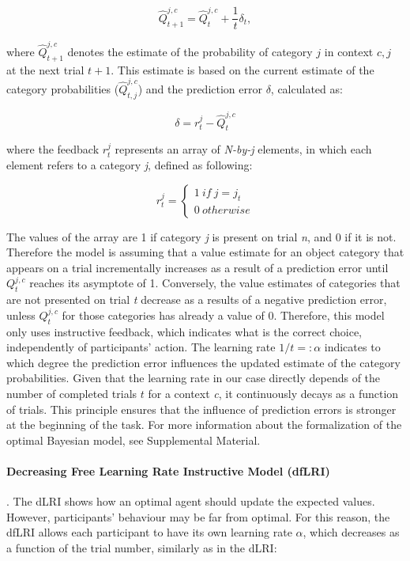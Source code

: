 \documentclass[a4paper,12pt]{article}
\begin{document}
\begin{equation}
\hat{Q}_{t+1}^{j,c} = \hat{Q}_{t}^{j,c}  + \dfrac{1}{t} \delta_{t},
\end{equation}


\noindent
where $\hat{Q}_{t+1}^{j,c}$ denotes the estimate of the probability of category $j$ in context ${c,j}$ at the next trial $t+1$. This estimate is based on the current estimate of the category probabilities ($\hat{Q}_{t,j}^{j, c}$) and the prediction error $\delta$, calculated as:

\begin{equation}
{\delta} = {r}_t^{j} - \hat{Q}_{t}^{j,c}
\label{eq:PE}
\end{equation}

\noindent
where the feedback ${r}_t^{j}$ represents an array of \textit{N-by-j} elements, in which each element refers to a category \textit{j}, defined as following:

\begin{equation}
r_t^j = \begin{cases}
1\ if  \ j = j_t  \\ 
0 \ otherwise
\end{cases}
\label{eq:instrPE}
\end{equation}

\noindent
 The values of the array are 1 if category \textit{j} is present on trial \textit{n}, and 0 if it is not. Therefore the model is assuming that a value estimate for an object category that appears on a trial incrementally increases as a result of a prediction error until $Q_{t}^{j,c}$ reaches its asymptote of 1. Conversely, the value estimates of categories that are not presented on trial \textit{t} decrease as a results of a negative prediction error, unless $Q_{t}^{j,c}$ for those categories has already a value of 0. 
Therefore, this model only uses instructive feedback, which indicates what is the correct choice, independently of participants' action. The learning rate $1/t =: \alpha$ indicates to which degree the prediction error influences the updated estimate of the category probabilities. Given that the learning rate in our case directly depends of the number of completed trials $t$ for a context \textit{c}, it continuously decays as a function of trials. This principle ensures that the influence of prediction errors is stronger at the beginning of the task. For more information about the formalization of the optimal Bayesian model, see Supplemental Material. 

\paragraph{Decreasing Free Learning Rate Instructive Model (dfLRI)}.
The dLRI shows how an optimal agent should update the expected values. However, participants' behaviour may be far from optimal.
For this reason, the dfLRI allows each participant to have its own learning rate $\alpha$, which decreases as a function of the trial number, similarly as in the dLRI: 
\end{document}

